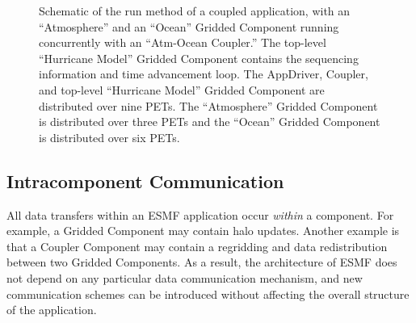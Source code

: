 \begin{center}
\begin{figure}
\caption{Schematic of the run method of a coupled application, with an
``Atmosphere'' and an ``Ocean'' Gridded Component running concurrently with 
an ``Atm-Ocean Coupler.''  The top-level ``Hurricane Model'' 
Gridded Component contains the sequencing information and time 
advancement loop.  The AppDriver, Coupler, and top-level ``Hurricane
Model'' Gridded Component are distributed over nine PETs.  The
``Atmosphere'' Gridded Component is distributed over three PETs and
the ``Ocean'' Gridded Component is distributed over six PETs.}
\label{fig:concurrent}
\end{figure}
\end{center}

\subsection{Intracomponent Communication}
\label{sec:localcomm}

All data transfers within an ESMF application occur {\it within} a
component.  For example, a Gridded Component may contain halo updates.
Another example is that a Coupler Component may contain a regridding
and data redistribution between two Gridded Components.  As a result,
the architecture of ESMF does not depend on any particular data
communication mechanism, and new communication schemes can be
introduced without affecting the overall structure of the application.

